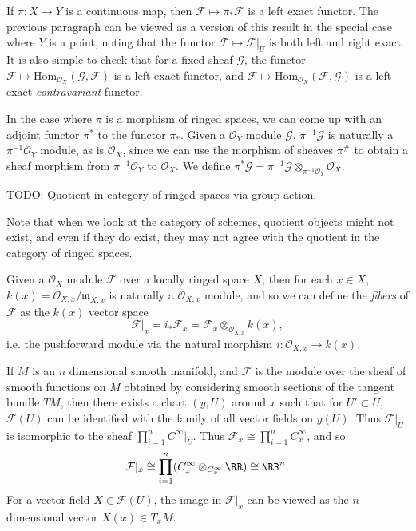 If $\pi: X \to Y$ is a continuous map, then $\mathcal{F} \mapsto \pi_* \mathcal{F}$ is a left exact functor. The previous paragraph can be viewed as a version of this result in the special case where $Y$ is a point, noting that the functor $\mathcal{F} \mapsto \mathcal{F}|_U$ is both left and right exact. It is also simple to check that for a fixed sheaf $\mathcal{G}$, the functor $\mathcal{F} \mapsto \text{Hom}_{\mathcal{O}_X}(\mathcal{G},\mathcal{F})$ is a left exact functor, and $\mathcal{F} \mapsto \text{Hom}_{\mathcal{O}_X}(\mathcal{F},\mathcal{G})$ is a left exact \emph{contravariant} functor.

In the case where $\pi$ is a morphism of ringed spaces, we can come up with an adjoint functor $\pi^*$ to the functor $\pi_*$. Given a $\mathcal{O}_Y$ module $\mathcal{G}$, $\pi^{-1} \mathcal{G}$ is naturally a $\pi^{-1} \mathcal{O}_Y$ module, as is $\mathcal{O}_X$, since we can use the morphism of sheaves $\pi^\#$ to obtain a sheaf morphism from $\pi^{-1} \mathcal{O}_Y$ to $\mathcal{O}_X$. We define $\pi^* \mathcal{G} = \pi^{-1} \mathcal{G} \otimes_{\pi^{-1} \mathcal{O}_Y} \mathcal{O}_X$.

\begin{example}
    TODO: Quotient in category of ringed spaces via group action.
\end{example}

Note that when we look at the category of schemes, quotient objects might not exist, and even if they do exist, they may not agree with the quotient in the category of ringed spaces.

Given a $\mathcal{O}_X$ module $\mathcal{F}$ over a locally ringed space $X$, then for each $x \in X$, $k(x) = \mathcal{O}_{X,x} / \mathfrak{m}_{X,x}$ is naturally a $\mathcal{O}_{X,x}$ module, and so we can define the \emph{fibers} of $\mathcal{F}$ as the $k(x)$ vector space
%
\[ \mathcal{F}|_x = i_* \mathcal{F}_x = \mathcal{F}_x \otimes_{\mathcal{O}_{X,x}} k(x), \]
%
i.e. the pushforward module via the natural morphism $i: \mathcal{O}_{X,x} \to k(x)$.

\begin{example}
    If $M$ is an $n$ dimensional smooth manifold, and $\mathcal{F}$ is the module over the sheaf of smooth functions on $M$ obtained by considering smooth sections of the tangent bundle $TM$, then there exists a chart $(y,U)$ around $x$ such that for $U' \subset U$, $\mathcal{F}(U)$ can be identified with the family of all vector fields on $y(U)$. Thus $\mathcal{F}|_U$ is isomorphic to the sheaf $\prod_{i = 1}^n C^\infty|_U$. Thus $\mathcal{F}_x \cong \prod_{i = 1}^n C^\infty_x$, and so
    \[ \mathcal{F}|_x \cong \prod_{i = 1}^n (C^\infty_x \otimes_{C^\infty_x} \RR) \cong \RR^n. \]
    For a vector field $X \in \mathcal{F}(U)$, the image in $\mathcal{F}|_x$ can be viewed as the $n$ dimensional vector $X(x) \in T_x M$.
\end{example}

